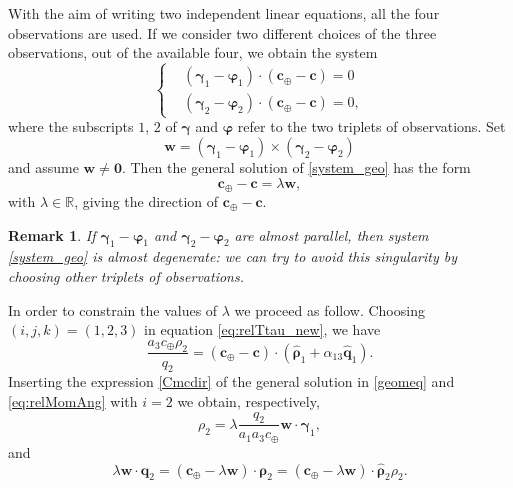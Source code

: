 \documentclass[11pt]{article}
\newtheorem{remark}{\bf Remark}
\begin{document}
With the aim of writing two independent linear equations, all the four observations are used. 
If we consider two different choices of the three observations, out of the available four, we obtain the system
\begin{equation}
    \left\{
    \begin{aligned}
        &(\bm{\gamma}_1-\bm{\varphi}_1)\cdot\left(\bm{c}_\oplus-\bm{c}\right) = 0\\
        &(\bm{\gamma}_2-\bm{\varphi}_2)\cdot\left(\bm{c}_\oplus-\bm{c}\right) = 0,
    \end{aligned}
    \right.
    \label{system_geo}
\end{equation}
where the subscripts $1$, $2$ of $\bm{\gamma}$ and $\bm{\varphi}$ refer to the two triplets of observations.
Set
\begin{equation*}
    \bm{w} = (\bm{\gamma}_1-\bm{\varphi}_1)\times(\bm{\gamma}_2-\bm{\varphi}_2)
\end{equation*}
and assume $\bm{w}\neq\bm{0}$.
%
Then the general solution of \eqref{system_geo} has the form
%
\begin{equation}
    \bm{c}_\oplus - \bm{c} = \lambda\bm{w},
    \label{Cmcdir}
\end{equation}
with $\lambda\in\mathbb{R}$, giving the direction of $\bm{c}_\oplus - \bm{c}$.
\begin{remark}
    If $\bm{\gamma}_1-\bm{\varphi}_1$ and $\bm{\gamma}_2-\bm{\varphi}_2$ are almost parallel, then system \eqref{system_geo} is almost degenerate: we can try to avoid this singularity by choosing other triplets of observations.
\end{remark}
In order to constrain the values of $\lambda$ we proceed as follow.
Choosing $(i,j,k) = (1,2,3)$ in equation \eqref{eq:relTtau_new}, we have
\begin{equation}
    \frac{a_3 c_\oplus\rho_2}{q_2} = (\bm{c}_\oplus-\bm{c})\cdot
    \left(\hat{\bm{\rho}}_1+\alpha_{13}\hat{\bm{q}}_1\right).
\label{geomeq}
\end{equation}
%
Inserting the expression \eqref{Cmcdir} of the general solution in \eqref{geomeq} and \eqref{eq:relMomAng} with $i=2$ we obtain, respectively, 
%
\begin{equation}\label{eq:rho2norm}
    \rho_2 = \lambda\frac{q_2}{a_1a_3c_\oplus}\bm{w}\cdot\bm{\gamma}_1,
\end{equation}
and
\begin{equation}\label{eq:geomRel}
    \lambda\bm{w}\cdot\bm{q}_2 = (\bm{c}_\oplus - \lambda\bm{w})\cdot\bm{\rho}_2
    = (\bm{c}_\oplus - \lambda\bm{w})\cdot\hat{\bm{\rho}}_2\rho_2.
\end{equation}
\end{document}
